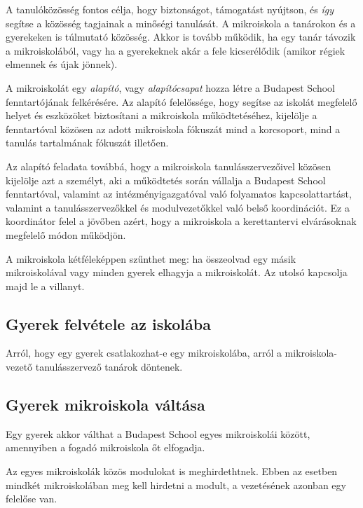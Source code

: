 A tanulóközösség fontos célja, hogy biztonságot, támogatást nyújtson, és
\emph{így} segítse a közösség tagjainak a minőségi tanulását. A mikroiskola a
tanárokon és a gyerekeken is túlmutató közösség. Akkor is tovább működik, ha
egy
tanár távozik a mikroiskolából, vagy ha a gyerekeknek akár a fele kicserélődik
(amikor
régiek elmennek és újak jönnek).

A mikroiskolát egy \emph{alapító}, vagy \emph{alapítócsapat} hozza létre a
Budapest School fenntartójának felkérésére.
Az alapító felelőssége, hogy segítse az iskolát megfelelő helyet és eszközöket
biztosítani a mikroiskola működtetéséhez, kijelölje a fenntartóval közösen az
adott mikroiskola fókuszát mind a korcsoport, mind a tanulás tartalmának
fókuszát illetően.

Az alapító feladata továbbá, hogy a mikroiskola tanulásszervezőivel közösen
kijelölje azt a személyt, aki a működtetés során vállalja a Budapest School
fenntartóval, valamint az intézményigazgatóval való folyamatos
kapcsolattartást, valamint a tanulásszervezőkkel és modulvezetőkkel való belső
koordinációt. Ez a koordinátor felel a jövőben azért, hogy a mikroiskola a
kerettantervi elvárásoknak megfelelő módon működjön.

A mikroiskola kétféleképpen szűnthet meg: ha összeolvad egy másik
mikroiskolával vagy minden gyerek elhagyja a mikroiskolát. Az utolsó kapcsolja
majd le a villanyt.

\subsection{Gyerek felvétele az iskolába}
Arról, hogy egy gyerek csatlakozhat-e egy mikroiskolába, arról a
mikroiskola-vezető tanulásszervező tanárok döntenek.

\subsection{Gyerek mikroiskola váltása}

Egy gyerek akkor válthat a Budapest School egyes mikroiskolái között,
amennyiben a fogadó mikroiskola őt elfogadja.

Az egyes mikroiskolák közös
modulokat is meghirdethtnek. Ebben az esetben mindkét mikroiskolában meg kell
hirdetni a modult, a vezetésének azonban egy felelőse van.
